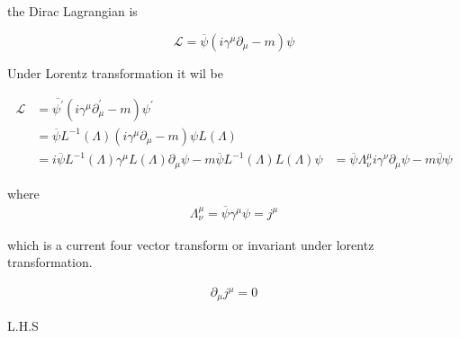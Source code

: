 \documentclass[12pt, letterpaper]{article}
\newcommand*{\1}{\hspace{1pt}}
\begin{document}
the Dirac Lagrangian is 

\begin{equation*}
    \mathcal{L} = \overline{\psi} (i \gamma ^{\mu} \partial _{\mu} - m) \psi
\end{equation*}

Under Lorentz transformation it wil be 

\begin{align*}
    \mathcal{L} &= \overline{\psi ^{\prime}} (i \gamma ^{\mu} \partial ^{\prime} _{\mu} - m) \psi ^{\prime} \\ 
    &= \overline{\psi}L ^{-1}(\Lambda) (i \gamma ^{\mu} \partial _{\mu} - m) \psi L(\Lambda) \\
    &= i\overline{\psi}L ^{-1}(\Lambda) \gamma ^{\mu}L(\Lambda)  \partial _{\mu} \psi -  m \overline{\psi}L ^{-1}(\Lambda) L(\Lambda) \psi
    &= \overline{\psi} \Lambda ^{\mu} _{\nu} i \gamma ^{\nu}  \partial _{\mu} \psi -  m \overline{\psi} \psi
\end{align*}

where
\begin{align*}
    \Lambda ^{\mu} _{\nu} = \overline{\psi} \gamma ^{\mu} \psi = j ^{\mu}
\end{align*}

which is a current four vector transform or invariant under lorentz transformation.

\begin{align*}
    \partial _{\mu} j^{\mu} = 0
\end{align*}

L.H.S 
\end{document}
